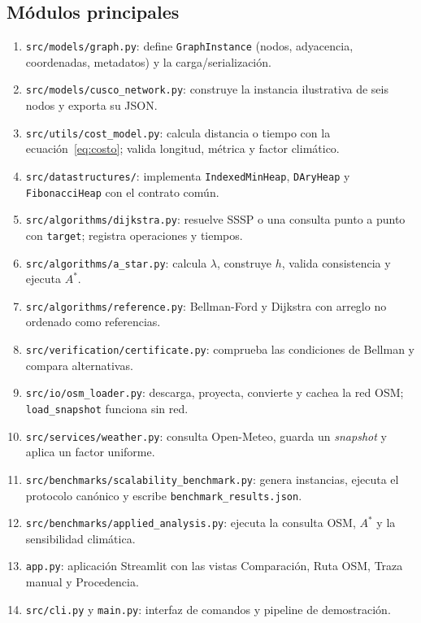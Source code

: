 \subsection{Módulos principales}
\begin{enumerate}
    \item \texttt{src/models/graph.py}: define \texttt{GraphInstance} (nodos, adyacencia, coordenadas, metadatos) y la carga/serialización.
    \item \texttt{src/models/cusco\_network.py}: construye la instancia ilustrativa de seis nodos y exporta su JSON.
    \item \texttt{src/utils/cost\_model.py}: calcula distancia o tiempo con la ecuación~\eqref{eq:costo}; valida longitud, métrica y factor climático.
    \item \texttt{src/datastructures/}: implementa \texttt{IndexedMinHeap}, \texttt{DAryHeap} y \texttt{FibonacciHeap} con el contrato común.
    \item \texttt{src/algorithms/dijkstra.py}: resuelve SSSP o una consulta punto a punto con \texttt{target}; registra operaciones y tiempos.
    \item \texttt{src/algorithms/a\_star.py}: calcula $\lambda$, construye $h$, valida consistencia y ejecuta $A^*$.
    \item \texttt{src/algorithms/reference.py}: Bellman-Ford y Dijkstra con arreglo no ordenado como referencias.
    \item \texttt{src/verification/certificate.py}: comprueba las condiciones de Bellman y compara alternativas.
    \item \texttt{src/io/osm\_loader.py}: descarga, proyecta, convierte y cachea la red OSM; \texttt{load\_snapshot} funciona sin red.
    \item \texttt{src/services/weather.py}: consulta Open-Meteo, guarda un \textit{snapshot} y aplica un factor uniforme.
    \item \texttt{src/benchmarks/scalability\_benchmark.py}: genera instancias, ejecuta el protocolo canónico y escribe \texttt{benchmark\_results.json}.
    \item \texttt{src/benchmarks/applied\_analysis.py}: ejecuta la consulta OSM, $A^*$ y la sensibilidad climática.
    \item \texttt{app.py}: aplicación Streamlit con las vistas Comparación, Ruta OSM, Traza manual y Procedencia.
    \item \texttt{src/cli.py} y \texttt{main.py}: interfaz de comandos y pipeline de demostración.
\end{enumerate}


